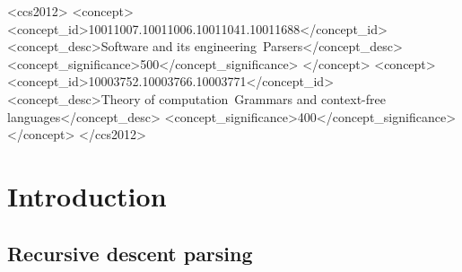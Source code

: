 \documentclass[manuscript]{acmart}
\begin{document}
\begin{CCSXML}
<ccs2012>
   <concept>
       <concept_id>10011007.10011006.10011041.10011688</concept_id>
       <concept_desc>Software and its engineering~Parsers</concept_desc>
       <concept_significance>500</concept_significance>
   </concept>
   <concept>
       <concept_id>10003752.10003766.10003771</concept_id>
       <concept_desc>Theory of computation~Grammars and context-free languages</concept_desc>
       <concept_significance>400</concept_significance>
   </concept>
 </ccs2012>
\end{CCSXML}



\maketitle

\section{Introduction}



\subsection{\label{sec:rec_desc}Recursive descent parsing}
\end{document}
